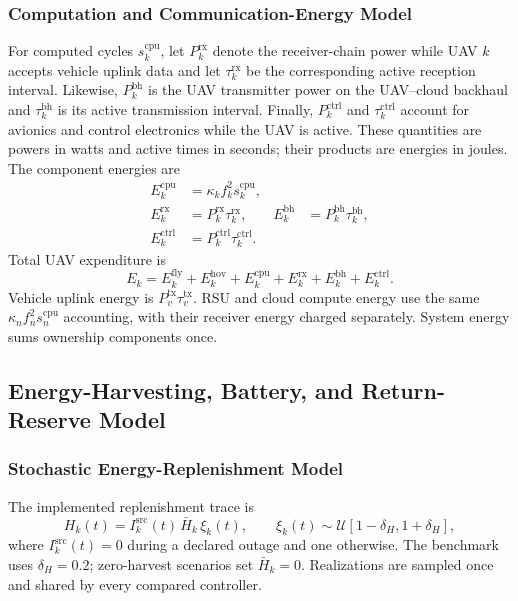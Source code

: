 \documentclass[journal]{IEEEtran}
\begin{document}
\subsubsection{Computation and Communication-Energy Model}
For computed cycles $s_k^{\mathrm{cpu}}$, let $P_k^{\mathrm{rx}}$ denote
the receiver-chain power while UAV $k$ accepts vehicle uplink data and let
$\tau_k^{\mathrm{rx}}$ be the corresponding active reception interval.
Likewise, $P_k^{\mathrm{bh}}$ is the UAV transmitter power on the
UAV--cloud backhaul and $\tau_k^{\mathrm{bh}}$ is its active transmission
interval.  Finally, $P_k^{\mathrm{ctrl}}$ and
$\tau_k^{\mathrm{ctrl}}$ account for avionics and control electronics while
the UAV is active.  These quantities are powers in watts and active times in
seconds; their products are energies in joules.  The component energies are
\begin{equation}
\begin{aligned}
E_k^{\mathrm{cpu}}&=\kappa_k f_k^2s_k^{\mathrm{cpu}},\\
E_k^{\mathrm{rx}}&=P_k^{\mathrm{rx}}\tau_k^{\mathrm{rx}},&
E_k^{\mathrm{bh}}&=P_k^{\mathrm{bh}}\tau_k^{\mathrm{bh}},\\
E_k^{\mathrm{ctrl}}&=P_k^{\mathrm{ctrl}}\tau_k^{\mathrm{ctrl}}.&&
\end{aligned}
\label{eq:energy_components}
\end{equation}
Total UAV expenditure is
\begin{equation}
E_k=E_k^{\mathrm{fly}}+E_k^{\mathrm{hov}}+E_k^{\mathrm{cpu}}
+E_k^{\mathrm{rx}}+E_k^{\mathrm{bh}}+E_k^{\mathrm{ctrl}}.
\label{eq:uav_energy}
\end{equation}
Vehicle uplink energy is $P_v^{\mathrm{tx}}\tau_v^{\mathrm{tx}}$.
RSU and cloud compute energy use the same
$\kappa_nf_n^2s_n^{\mathrm{cpu}}$ accounting, with their receiver
energy charged separately.  System energy sums ownership components
once.

\subsection{Energy-Harvesting, Battery, and Return-Reserve Model}
\subsubsection{Stochastic Energy-Replenishment Model}
The implemented replenishment trace is
\begin{equation}
H_k(t)=I_k^{\mathrm{src}}(t)\,\bar H_k\,\xi_k(t),\qquad
\xi_k(t)\sim\mathcal U[1-\delta_H,1+\delta_H],
\label{eq:stochastic_harvest}
\end{equation}
where $I_k^{\mathrm{src}}(t)=0$ during a declared outage and one
otherwise.  The benchmark uses $\delta_H=0.2$; zero-harvest scenarios
set $\bar H_k=0$.  Realizations are sampled once and shared by every
compared controller.
\end{document}
